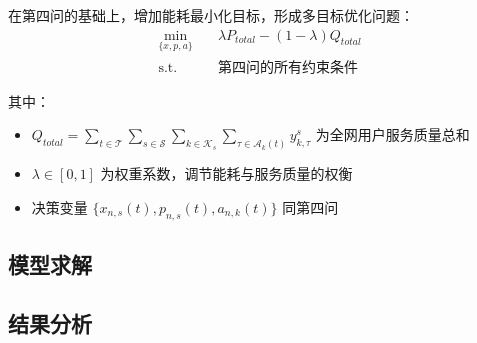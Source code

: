 在第四问的基础上，增加能耗最小化目标，形成多目标优化问题：
\begin{equation}
\begin{aligned}
\min_{\{x,p,a\}} \quad & \lambda P_{total} - (1-\lambda) Q_{total} \\
\text{s.t.} \quad & \text{第四问的所有约束条件}
\end{aligned}
\end{equation}

其中：
\begin{itemize}
  \item $Q_{total} = \sum_{t\in\mathcal{T}}\sum_{s\in\mathcal{S}}\sum_{k\in\mathcal{K}_s}\sum_{\tau\in\mathcal{A}_k(t)} y^{s}_{k,\tau}$ 为全网用户服务质量总和
  \item $\lambda \in [0,1]$ 为权重系数，调节能耗与服务质量的权衡
  \item 决策变量 $\{x_{n,s}(t), p_{n,s}(t), a_{n,k}(t)\}$ 同第四问
\end{itemize}

\subsection{模型求解}


\subsection{结果分析}

